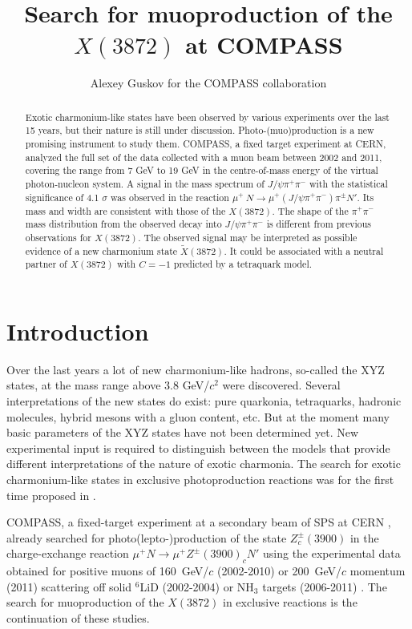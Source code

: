 \documentclass[a4paper]{jpconf}
\begin{document}
\title{Search for muoproduction of the $X(3872)$ at COMPASS}

\author{Alexey Guskov for the COMPASS collaboration}

\address{Joint Institute for Nuclear Research, Dubna, Russia}


\begin{abstract}
 Exotic charmonium-like states have been observed  by various experiments over the last 15 years,
but their nature is still under discussion. Photo-(muo)production is a new promising instrument to study them. 
COMPASS, a fixed target experiment at CERN, analyzed the full set of the data collected with a
muon beam between 2002 and 2011, covering the range from 7 GeV to 19 GeV in the centre-of-mass energy
of the virtual photon-nucleon system.  A signal in the mass spectrum of $J/\psi\pi^+\pi^-$ with the statistical significance
 of 4.1 $\sigma$ was observed in the reaction $\mu^+~N \rightarrow \mu^+(J/\psi\pi^+\pi^- )\pi^{\pm} N'$. Its mass and 
width are consistent with those of the $X(3872)$. The shape of the $\pi^+\pi^-$ mass distribution from the observed decay
 into $J/\psi\pi^+\pi^-$  is different from previous observations for $X(3872)$. The observed signal  may be
 interpreted as  possible evidence of a new charmonium state $\widetilde{X}(3872)$. It could be associated with a neutral partner of 
$X(3872)$ with $C = -1$ predicted by a tetraquark model. 
\end{abstract}

\section{Introduction}

Over the last years a lot of new charmonium-like hadrons, so-called the XYZ states, at the mass range above 3.8 GeV/$c^2$ were discovered.
Several interpretations of the new states do exist: pure quarkonia, tetraquarks, hadronic molecules, hybrid mesons with a gluon content, etc. But at the moment many basic parameters of the XYZ states have not been determined yet. New experimental input is required
to distinguish between the models that provide different interpretations of the nature of exotic charmonia. The search for exotic charmonium-like states in exclusive photoproduction reactions was for the first time proposed in \cite{photo0,photo1,photo2}.

COMPASS, a fixed-target experiment at a secondary beam of SPS at CERN \cite{proposal, COMPASS1}, already searched for photo(lepto-)production of the state $Z^{\pm}_c(3900)$ in the charge-exchange reaction $\mu^+N \to \mu^+ Z^{\pm}(3900)_c N'$ using the experimental data obtained for positive muons of 160~GeV/$c$ (2002-2010) or 200~GeV/$c$ momentum (2011)  scattering off solid $^6$LiD  (2002-2004) or NH$_3$ targets (2006-2011) \cite{Zc}. The search for muoproduction of the $X(3872)$ in exclusive %
 reactions is  the continuation of these studies.
\end{document}

